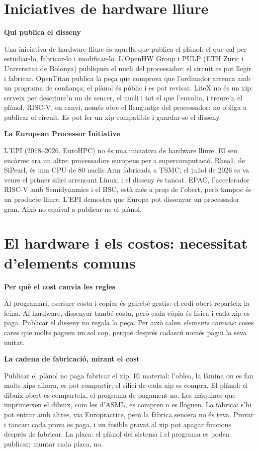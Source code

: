 \documentclass[catalan, a4paper]{article}
\begin{document}
\section{Iniciatives de hardware lliure}

\textbf{Qui publica el disseny}

Una iniciativa de hardware lliure és aquella que publica el plànol: el que cal per estudiar-lo, fabricar-lo i modificar-lo. L'OpenHW Group i PULP (ETH Zuric i Universitat de Bolonya) publiquen el nucli del processador: el circuit es pot llegir i fabricar. OpenTitan publica la peça que comprova que l'ordinador arrenca amb un programa de confiança; el plànol és públic i es pot revisar. LiteX no és un xip: serveix per descriure'n un de sencer, el nucli i tot el que l'envolta, i treure'n el plànol. RISC-V, en canvi, només obre el llenguatge del processador: no obliga a publicar el circuit. Es pot fer un xip compatible i guardar-se el disseny.

\textbf{La European Processor Initiative}

L'EPI (2018--2026, EuroHPC) no és una iniciativa de hardware lliure. El seu encàrrec era un altre: processadors europeus per a supercomputació. Rhea1, de SiPearl, és una CPU de 80 nuclis Arm fabricada a TSMC; el juliol de 2026 es va veure el primer silici arrencant Linux, i el disseny és tancat. EPAC, l'accelerador RISC-V amb Semidynamics i el BSC, està més a prop de l'obert, però tampoc és un producte lliure. L'EPI demostra que Europa pot dissenyar un processador gran. Això no equival a publicar-ne el plànol.

\section{El hardware i els costos: necessitat d'elements comuns}

\textbf{Per què el cost canvia les regles}

Al programari, escriure costa i copiar és gairebé gratis: el codi obert reparteix la feina. Al hardware, dissenyar també costa, però cada còpia és física i cada xip es paga. Publicar el disseny no regala la peça. Per això calen \textit{elements comuns}: coses cares que molts paguen un sol cop, perquè després cadascú només pagui la seva unitat.

\textbf{La cadena de fabricació, mirant el cost}

Publicar el plànol no paga fabricar el xip. El material: l'oblea, la làmina on es fan molts xips alhora, es pot compartir; el silici de cada xip es compra. El plànol: el dibuix obert es comparteix, el programa de pagament no. Les màquines que imprimeixen el dibuix, com les d'ASML, es compren o es lloguen. La fàbrica: s'hi pot entrar amb altres, via Europractice, però la fàbrica sencera no és teva. Provar i tancar: cada prova es paga, i un fusible gravat al xip pot apagar funcions després de fabricar. La placa: el plànol del sistema i el programa es poden publicar; muntar cada placa, no.
\end{document}

